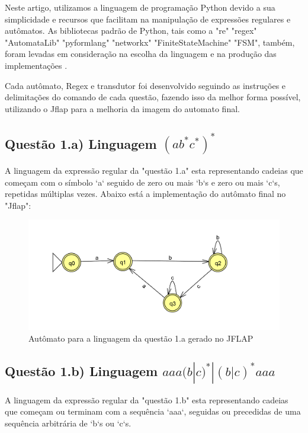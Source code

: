 \documentclass[12pt]{article}
\begin{document}
Neste artigo, utilizamos a linguagem de programação Python devido a sua simplicidade e recursos que facilitam na manipulação de expressões regulares e autômatos. As bibliotecas padrão de Python, tais como a "re" "regex" "AutomataLib" "pyformlang" "networkx" "FiniteStateMachine" "FSM", também, foram levadas em consideração na escolha da linguagem e na produção das implementações . 

Cada autômato, Regex e transdutor foi desenvolvido seguindo as instruções e delimitações do comando de cada questão, fazendo isso da melhor forma possível, utilizando o Jflap para a melhoria da imagem do automato final.

\subsection{Questão 1.a) Linguagem \((ab^*c^*)^*\)}

A linguagem da expressão regular da "questão 1.a" esta representando cadeias que começam com o símbolo `a` seguido de zero ou mais `b`s e zero ou mais `c`s, repetidas múltiplas vezes. Abaixo está a implementação do autômato final no "Jflap":

\begin{figure}[H]
\centering
\includegraphics[width=1\textwidth]{questao1/output/questao 1 automatos.png} 
\caption{ Autômato para a linguagem da questão 1.a gerado no JFLAP}
\label{fig:regexExplanation}
\end{figure}


\subsection{Questão 1.b) Linguagem \(aaa(b | c)^* | (b | c)^* aaa\)}

A linguagem da expressão regular da "questão 1.b" esta representando cadeias que começam ou terminam com a sequência `aaa`, seguidas ou precedidas de uma sequência arbitrária de `b`s ou `c`s.
\end{document}
